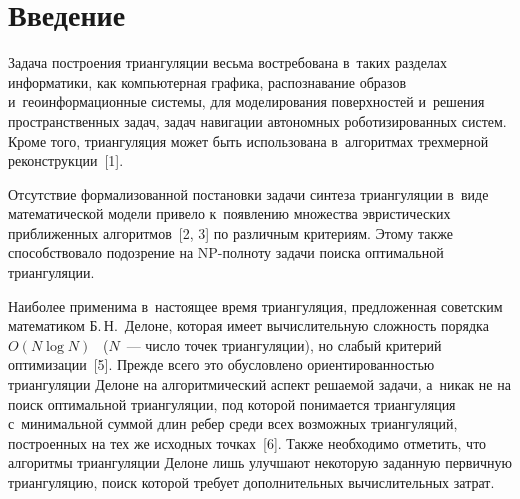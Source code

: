   
  



\thispagestyle{headings}

\begin{multicols}{2}

\label{st\stat}

\section{Введение}

  Задача построения триангуляции весьма востребована в~таких разделах 
информатики, как компьютерная графика, рас\-по\-зна\-ва\-ние образов 
и~геоинформационные сис\-те\-мы, для моделирования поверхно\-стей и~решения 
про\-стран\-ст\-вен\-ных задач, задач навигации автономных роботизированных 
сис\-тем. Кроме того, триангуляция может быть использована в~алгоритмах 
трехмерной реконструкции~[1].
  
  Отсутствие формализованной постановки задачи синтеза триангуляции 
в~виде математической модели привело к~по\-яв\-ле\-нию множества эвристических 
при\-бли\-жен\-ных алгоритмов~[2, 3] по различным критериям. Этому также 
способствовало подозрение на NP-пол\-но\-ту задачи поиска оптимальной 
триангуляции.
  
  Наиболее применима в~настоящее время триангуляция, предложенная 
советским матема\-ти\-ком Б.\,Н.~Делоне, которая имеет вы\-чис\-ли\-тель\-ную 
\mbox{слож\-ность} порядка $O(N\log N)$~\cite{3-man, 4-man} ($N$~--- число точек 
триангуляции), но слабый критерий оптимизации~[5]. Прежде всего это 
обусловлено ориентированностью триангуляции Делоне на алгоритмический 
аспект ре\-ша\-емой задачи, а~никак не на поиск оптимальной триангуляции, под 
которой понимается триангуляция с~минимальной суммой длин ребер среди 
всех воз\-мож\-ных триангуляций, по\-стро\-ен\-ных на тех же исходных точ\-ках~[6]. 
Также необходимо отметить, что алгоритмы триангуляции Делоне лишь 
улучшают некоторую заданную первичную триангуляцию, поиск которой 
требует дополнительных вы\-чис\-ли\-тель\-ных затрат.

\begin{figure*}[b] %
 \vspace*{1pt}
 \begin{center}
 \mbox{%
 \epsfxsize=162.307mm 
 }
 \end{center}
\vspace*{-9pt}
\end{figure*}


\end{multicols}
